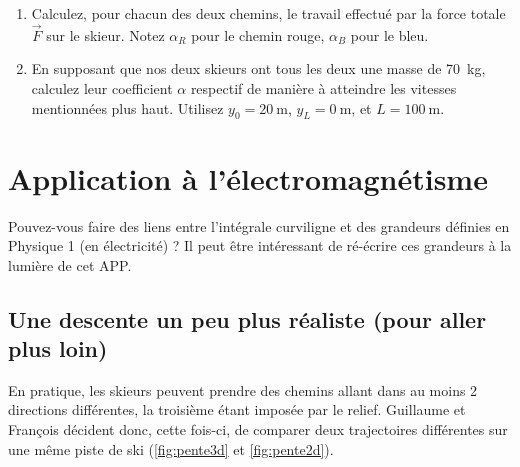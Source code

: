 \documentclass{cup-pan}
\begin{document}
\vspace{\baselineskip}


\vspace{\baselineskip}
\questions
\begin{enumerate}
    \item Calculez, pour chacun des deux chemins, le travail effectué par la force totale $\vec{F}$ sur le skieur. Notez $\alpha_R$ pour le chemin rouge, $\alpha_B$ pour le bleu.
    \item En supposant que nos deux skieurs ont tous les deux une masse de \SI{70}{\kilo\gram}, calculez leur coefficient $\alpha$ respectif de manière à atteindre les vitesses mentionnées plus haut. Utilisez $y_0 = \SI{20}{\meter}$, $y_L = \SI{0}{\meter}$, et $L = \SI{100}{\meter}$.
\end{enumerate}


\section*{Application à l'électromagnétisme}

Pouvez-vous faire des liens entre l'intégrale curviligne et des grandeurs définies en Physique 1 (en électricité) ? Il peut être intéressant de ré-écrire ces grandeurs à la lumière de cet APP. 

\pagebreak

\subsection{Une descente un peu plus réaliste (pour aller plus loin)}

En pratique, les skieurs peuvent prendre des chemins allant dans au moins 2 directions différentes, la troisième étant imposée par le relief. Guillaume et François décident donc, cette fois-ci, de comparer deux trajectoires différentes sur une même piste de ski (\autoref{fig:pente3d} et \autoref{fig:pente2d}).
\end{document}
